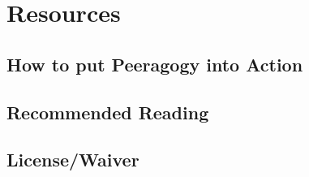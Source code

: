 \documentclass[ebook, 12pt, twoside]{memoir}
\let\sc\scshape
\let\sc\scshape
\begin{document}
\part{Resources} \label{resources-part} %
%
%
\chapter[\textbf{How to put Peeragogy into Action}]{How to put Peeragogy into Action}
%

%
%
%
\chapter[\textbf{Recommended Reading}]{Recommended Reading}
%

%
%
%
%
%
%



\newpage
\chapter[\textbf{License/Waiver}]{License/Waiver}

%
\pagestyle{empty} \thispagestyle{empty}
\clearpage\mbox{}\clearpage
\end{document}

